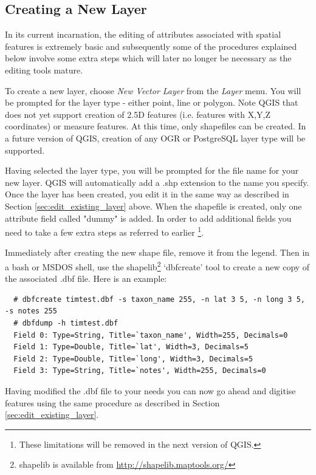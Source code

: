 \subsection{Creating a New Layer}

In its current incarnation, the editing of attributes associated with spatial
features is extremely basic and subsequently some of the procedures explained
below involve some extra steps which will later no longer be necessary as
the editing tools mature.

To create a new layer, choose \textit{New Vector Layer} from the \textit{Layer}
menu. You will be prompted for the layer type - either point, line or polygon.
Note QGIS that
does not yet support creation of 2.5D features (i.e. features with X,Y,Z
coordinates) or measure features. At this time, only shapefiles can be
created. In a future version of QGIS, creation of any OGR or PostgreSQL layer type will be supported.

Having selected the layer type, you will be prompted for the file name for your
new layer. QGIS will automatically add a .shp extension to the name you specify.
Once the layer has been created, you edit it in the same way as described in
Section \ref{sec:edit_existing_layer} above. When the shapefile is created,
only one attribute field called "dummy" is added.
In order to add additional fields you need to
take a few extra steps as referred to earlier \footnote{These
limitations will be removed in the next version of QGIS.}. 

Immediately after creating the new shape file, remove it from the legend. Then in a bash or MSDOS shell, use the
shapelib\footnote{shapelib is available from
\url{http://shapelib.maptools.org/}} `dbfcreate' tool to create a new copy of
the associated .dbf file. Here is an example:

\begin{verbatim}
  # dbfcreate timtest.dbf -s taxon_name 255, -n lat 3 5, -n long 3 5, -s notes 255
  # dbfdump -h timtest.dbf
  Field 0: Type=String, Title=`taxon_name', Width=255, Decimals=0
  Field 1: Type=Double, Title=`lat', Width=3, Decimals=5
  Field 2: Type=Double, Title=`long', Width=3, Decimals=5
  Field 3: Type=String, Title=`notes', Width=255, Decimals=0
\end{verbatim} 

Having modified the .dbf file to your needs you can now go ahead and digitise features using the same procedure as described in Section \ref{sec:edit_existing_layer}.
